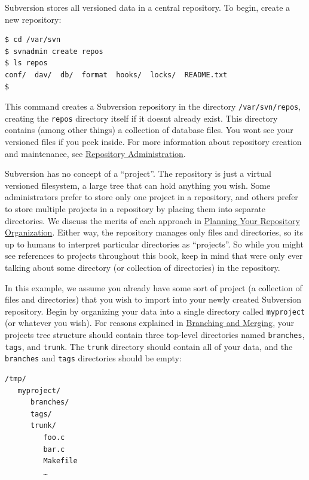 Subversion stores all versioned data in a central repository. To begin,
create a new repository:

\begin{verbatim}
$ cd /var/svn
$ svnadmin create repos
$ ls repos
conf/  dav/  db/  format  hooks/  locks/  README.txt
$
\end{verbatim}

This command creates a Subversion repository in the directory
\texttt{/var/svn/repos}, creating the \texttt{repos} directory itself if
it doesn\textquotesingle t already exist. This directory contains (among
other things) a collection of database files. You won\textquotesingle t
see your versioned files if you peek inside. For more information about
repository creation and maintenance, see
\hyperref[svn.reposadmin]{Repository Administration}.

Subversion has no concept of a ``project''. The repository is just a
virtual versioned filesystem, a large tree that can hold anything you
wish. Some administrators prefer to store only one project in a
repository, and others prefer to store multiple projects in a repository
by placing them into separate directories. We discuss the merits of each
approach in \hyperref[svn.reposadmin.projects.chooselayout]{Planning
Your Repository Organization}. Either way, the repository manages only
files and directories, so it\textquotesingle s up to humans to interpret
particular directories as ``projects''. So while you might see
references to projects throughout this book, keep in mind that
we\textquotesingle re only ever talking about some directory (or
collection of directories) in the repository.

In this example, we assume you already have some sort of project (a
collection of files and directories) that you wish to import into your
newly created Subversion repository. Begin by organizing your data into
a single directory called \texttt{myproject} (or whatever you wish). For
reasons explained in \hyperref[svn.branchmerge]{Branching and Merging},
your project\textquotesingle s tree structure should contain three
top-level directories named \texttt{branches}, \texttt{tags}, and
\texttt{trunk}. The \texttt{trunk} directory should contain all of your
data, and the \texttt{branches} and \texttt{tags} directories should be
empty:

\begin{verbatim}
/tmp/
   myproject/
      branches/
      tags/
      trunk/
         foo.c
         bar.c
         Makefile
         …
\end{verbatim}

